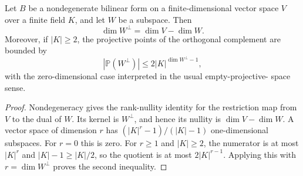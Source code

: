 \begin{helper}
Let $B$ be a nondegenerate bilinear form on a finite-dimensional vector
space $V$ over a finite field $K$, and let $W$ be a subspace.  Then
\[
 \dim W^{\perp}=\dim V-\dim W.
\]
Moreover, if $|K|\geq2$, the projective points of the orthogonal complement
are bounded by
\[
 \left|\mathbb P(W^{\perp})\right|
 \leq 2|K|^{\dim W^{\perp}-1},
\]
with the zero-dimensional case interpreted in the usual empty-projective-
space sense.
\end{helper}
\begin{proof}
Nondegeneracy gives the rank-nullity identity for the restriction map from
$V$ to the dual of $W$.  Its kernel is $W^{\perp}$, and hence its nullity is
$\dim V-\dim W$.  A vector space of dimension $r$ has
$(|K|^r-1)/(|K|-1)$ one-dimensional subspaces.  For $r=0$ this is zero.  For
$r\geq1$ and $|K|\geq2$, the numerator is at most $|K|^r$ and
$|K|-1\geq |K|/2$, so the quotient is at most
$2|K|^{r-1}$.  Applying this with $r=\dim W^{\perp}$ proves the second
inequality.
\end{proof}
